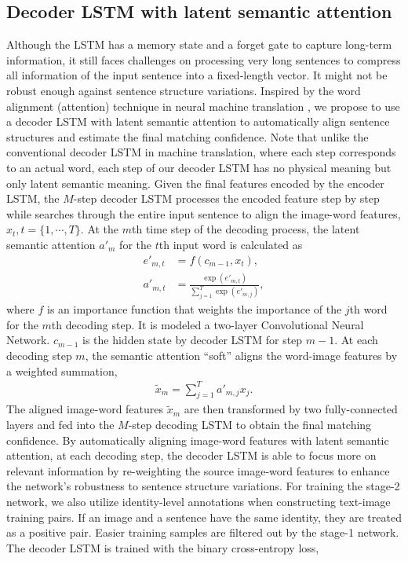 \subsection{Decoder LSTM with latent semantic attention}
Although the LSTM has a memory state and a forget gate to capture long-term information, it still faces challenges on processing very long sentences to compress all information of the input sentence into a fixed-length vector. It might not be robust enough against sentence structure variations. Inspired by the word alignment (attention) technique in neural machine translation \cite{bahdanau2014neural}, we propose to use a decoder LSTM with latent semantic attention to automatically align sentence structures and estimate the final matching confidence. Note that unlike the conventional decoder LSTM in machine translation, where each step corresponds to an actual word, each step of our decoder LSTM has no physical meaning but only latent semantic meaning.
Given the final features encoded by the encoder LSTM, the $M$-step decoder LSTM processes the encoded feature step by step while searches through the entire input sentence to align the image-word features, $x_t, t=\{1, \cdots, T\}$.
At the $m$th time step of the decoding process, the latent semantic attention $a'_{m}$ for the $t$th input word is calculated as
\begin{align}
e'_{m, t} &= f(c_{m-1}, x_t), \\
a'_{m, t} &= \frac{\exp (e'_{m,t})} {\sum_{j=1}^{T} {\exp (e'_{m,j}) } },
\label{eq:3}
\end{align}
where $f$ is an importance function that weights the importance of the $j$th word for the $m$th decoding step. It is modeled a two-layer Convolutional Neural Network. $c_{m-1}$ is the hidden state by decoder LSTM for step $m-1$.
At each decoding step $m$, the semantic attention ``soft'' aligns the word-image features by a weighted summation,
\begin{align}
\tilde{x}_m = \sum_{j=1}^{T} {a'_{m,j} x_j}.
\end{align}
The aligned image-word features $\tilde{x}_m$ are then transformed by two fully-connected layers and fed into the $M$-step decoding LSTM to obtain the final matching confidence.
By automatically aligning image-word features with latent semantic attention, at each decoding step, the decoder LSTM is able to focus more on relevant information by re-weighting the source image-word features to enhance the network's robustness to sentence structure variations.
For training the stage-2 network, we also utilize identity-level annotations when constructing text-image training pairs. If an image and a sentence have the same identity, they are treated as a positive pair. Easier training samples are filtered out by the stage-1 network. The decoder LSTM is trained with the binary cross-entropy loss,
